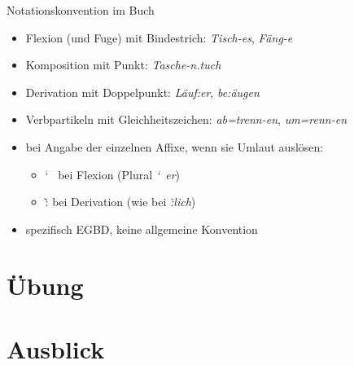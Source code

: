 \begin{frame}
  {Notationskonvention im Buch}
  \pause
  \begin{itemize}[<+->]
    \item \alert{Flexion (und Fuge)} mit Bindestrich: \textit{Tisch-es}, \textit{Fäng-e}
    \item \alert{Komposition} mit Punkt: \textit{Tasche-n.tuch}
    \item \alert{Derivation} mit Doppelpunkt: \textit{Läuf:er}, \textit{be:äugen}
    \item \alert{Verbpartikeln} mit Gleichheitszeichen: \textit{ab=trenn-en}, \textit{um=renn-en}
    \Halbzeile
    \item bei Angabe der einzelnen Affixe, wenn sie Umlaut auslösen:
      \begin{itemize}[<+->]
        \item \char`~ bei Flexion (Plural \textit{\char`~er})
        \item \~: bei Derivation (wie bei \textit{\~:lich})
      \end{itemize}
    \Halbzeile
  \item spezifisch EGBD, keine allgemeine Konvention
  \end{itemize}
\end{frame}



\section{Übung}


\section{Ausblick}

